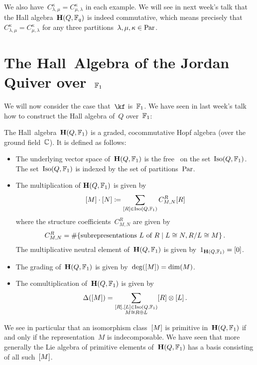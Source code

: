 \documentclass[a4paper,11pt]{scrartcl}
\begin{document}
\begin{example}
  We also have~$C^{\kappa}_{\lambda, \mu} = C^{\kappa}_{\mu, \lambda}$ in each example.
  We will see in next week’s talk that the Hall algebra~$\mathbf{H}(Q, \mathbb{F}_q)$ is indeed commutative, which means precisely that~$C^\kappa_{\lambda, \mu} = C^\kappa_{\mu, \lambda}$ for any three partitions~$\lambda, \mu, \kappa \in \mathrm{Par}$.
\end{example}





\section{The Hall~Algebra of the Jordan Quiver over~$\mathbb{F}_1$}

We will now consider the case that~$\kf$ is~$\mathbb{F}_1$.
We have seen in last week’s talk how to construct the Hall algebra of~$Q$ over~$\mathbb{F}_1$:

\begin{recall}
  The Hall~algebra~$\mathbf{H}(Q, \mathbb{F}_1)$ is a graded, cocommutative Hopf algebra (over the ground field~$\Complex$).
  It is defined as follows:
  \begin{itemize}
    \item
      The underlying vector space of~$\mathbf{H}(Q, \mathbb{F}_1)$ is the free~\vectorspace{$\Complex$} on the set~$\operatorname{Iso}(Q, \mathbb{F}_1)$.
      The set~$\operatorname{Iso}(Q, \mathbb{F}_1)$ is indexed by the set of partitions~$\mathrm{Par}$.
    \item
      The multiplication of$~\mathbf{H}(Q, \mathbb{F}_1)$ is given by
      \[
        [M] \cdot [N]
        \coloneqq
        \sum_{[R] \in \operatorname{Iso}(Q, \mathbb{F}_1)}
        C^R_{M,N} [R]
      \]
      where the structure coefficients~$C^R_{M,N}$ are given by
      \[
        C^R_{M,N}
        =
        \counting
        \{
          \text{subrepresentations~$L$ of~$R$}
        \suchthat
          L \cong N, R/L \cong M
        \} \,.
      \]
      The multiplicative neutral element of~$\mathbf{H}(Q, \mathbb{F}_1)$ is given by~$1_{\mathbf{H}(Q, \mathbb{F}_1)} = [0]$.
    \item
      The grading of~$\mathbf{H}(Q, \mathbb{F}_1)$ is given by~$\deg( [M] ) = \dim(M)$.
    \item
      The comultiplication of~$\mathbf{H}(Q, \mathbb{F}_1)$ is given by
      \[
        \Delta( [M] )
        =
        \sum_{
          \substack{
            [R], [L] \in \operatorname{Iso}(Q, \mathbb{F}_1) \\
            M \cong R \oplus L
          }
        }
        [R] \otimes [L] \,.
      \]
  \end{itemize}
  We see in particular that an isomorphism class~$[M]$ is primitive in~$\mathbf{H}(Q, \mathbb{F}_1)$ if and only if the representation~$M$ is indecomposable.
  We have seen that more generally the Lie algebra of primitive elements of~$\mathbf{H}(Q, \mathbb{F}_1)$ has a basis consisting of all such~$[M]$.
\end{recall}
\end{document}
